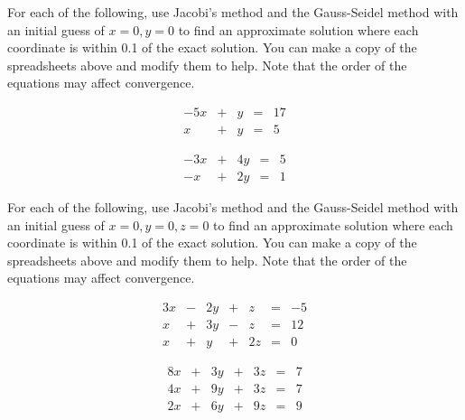 \documentclass{ximera}
\begin{document}
\begin{problem}\label{prob:systems-iterative}
For each of the following, use Jacobi's method and the Gauss-Seidel method with an initial guess of $x=0,y=0$ to find an approximate solution where each coordinate is within 0.1 of the exact solution.  You can make a copy of the spreadsheets above and modify them to help.  Note that the order of the equations may affect convergence.

\begin{problem}\label{prob:systems-iterative-1}
\begin{equation*}\begin{array}{ccccc}
      -5x& +&y&=&17\\
      x & +&y&= &5 
    \end{array}
\end{equation*}
\end{problem}

\begin{problem}\label{prob:systems-iterative-2}
\begin{equation*}\begin{array}{ccccc}
      -3x& +&4y&=&5\\
      -x & +&2y&= &1 
    \end{array}
\end{equation*}
\end{problem}

\end{problem}

\begin{problem}\label{prob:systems-iterative-3x3}
For each of the following, use Jacobi's method and the Gauss-Seidel method with an initial guess of $x=0,y=0, z=0$ to find an approximate solution where each coordinate is within 0.1 of the exact solution.  You can make a copy of the spreadsheets above and modify them to help.  Note that the order of the equations may affect convergence.

\begin{problem}\label{prob:systems-iterative-3x3-1}
\begin{equation*}\begin{array}{ccccccc}
      3x& -&2y&+&z&=&-5\\
      x& +&3y&-&z&=&12\\
      x& +&y&+&2z&=&0
    \end{array}
\end{equation*}
\end{problem}

\begin{problem}\label{prob:systems-iterative-3x3-2}
\begin{equation*}\begin{array}{ccccccc}
      8x& +&3y&+&3z&=&7\\
      4x& +&9y&+&3z&=&7\\
      2x& +&6y&+&9z&=&9
    \end{array}
\end{equation*}
\end{problem}

\end{problem}
\end{document}
